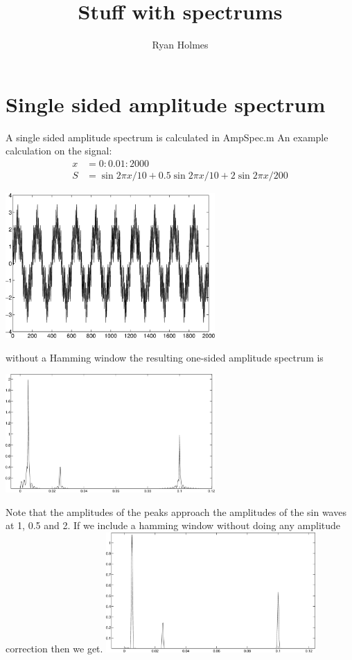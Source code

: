 \documentclass{article}
\title{Stuff with spectrums}
\author{Ryan Holmes} \geometry{a4paper}
\begin{document}
\maketitle
\section{Single sided amplitude spectrum}

A single sided amplitude spectrum is calculated in AmpSpec.m An
example calculation on the signal:
\begin{align*}
x &= 0:0.01:2000 \\
S &= \sin{2\pi x/10}+0.5\sin{2\pi x/10}+2\sin{2\pi x/200} \end{align*}

\includegraphics[width=8cm]{signalplot.png}

without a Hamming window the resulting one-sided amplitude spectrum
is

\includegraphics[width=8cm]{AmpSpecNoHam.png}

Note that the amplitudes of the peaks approach the amplitudes of the
sin waves at 1, 0.5 and 2.
If we include a hamming window without doing any amplitude correction
then we get.
\includegraphics[width=8cm]{AmpSpecHam.png}
\end{document}
